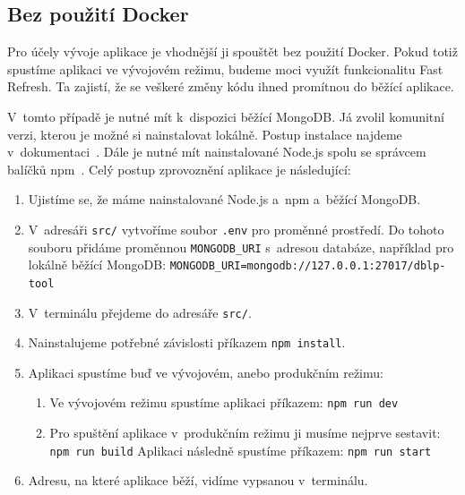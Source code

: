 \documentclass[
  biblatex,
  sourcecodes,
  glossaries,
  index
]{kidiplom}
\begin{document}
\subsection{Bez použití Docker}

Pro účely vývoje aplikace je vhodnější ji spouštět bez použití Docker. Pokud totiž spustíme aplikaci ve vývojovém režimu, budeme moci využít funkcionalitu Fast Refresh. Ta zajistí, že se veškeré změny kódu ihned promítnou do běžící aplikace.

V~tomto případě je nutné mít k~dispozici běžící MongoDB. Já zvolil komunitní verzi, kterou je možné si nainstalovat lokálně. Postup instalace najdeme v~dokumentaci~\cite{t35}. Dále je nutné mít nainstalované Node.js spolu se správcem balíčků npm~\cite{t36}. Celý postup zprovoznění aplikace je následující:

\begin{enumerate}
\item Ujistíme se, že máme nainstalované Node.js a~npm a~běžící MongoDB.
\item V~adresáři \texttt{src/} vytvoříme soubor \texttt{.env} pro proměnné prostředí. Do tohoto souboru přidáme proměnnou \texttt{MONGODB\_URI} s~adresou databáze, například pro lokálně běžící MongoDB:
\vspace{2mm}\newline
\texttt{MONGODB\_URI=mongodb://127.0.0.1:27017/dblp-tool}
\item V~terminálu přejdeme do adresáře \texttt{src/}.
\item Nainstalujeme potřebné závislosti příkazem \texttt{npm install}.
\item Aplikaci spustíme buď ve vývojovém, anebo produkčním režimu:
\begin{enumerate}
\item Ve vývojovém režimu spustíme aplikaci příkazem:
\vspace{2mm}\newline
\texttt{npm run dev}
\item Pro spuštění aplikace v~produkčním režimu ji musíme nejprve sestavit:\vspace{2mm}\newline
\texttt{npm run build}
\vspace{2mm}\newline
Aplikaci následně spustíme příkazem:
\vspace{2mm}\newline
\texttt{npm run start}
\end{enumerate}
\item Adresu, na které aplikace běží, vidíme vypsanou v~terminálu.
\end{enumerate}
\end{document}
